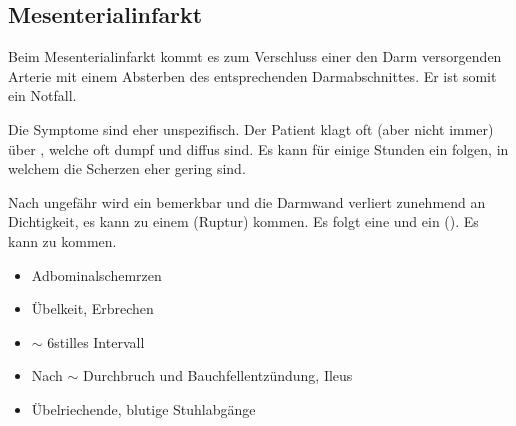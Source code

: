 \bigskip



\subsection{Mesenterialinfarkt}
\label{topic:mesenterialinfarkt}

Beim Mesenterialinfarkt kommt es zum Verschluss einer den
Darm versorgenden Arterie
 mit einem Absterben des entsprechenden
Darmabschnittes. Er ist somit ein  Notfall.

{Die Symptome sind eher unspezifisch. Der Patient klagt oft
(aber nicht immer) über , welche
oft dumpf und diffus sind. Es kann für einige Stunden ein
 folgen, in welchem die Scherzen eher
gering sind. 

Nach ungefähr \Hour* wird ein
 bemerkbar und die Darmwand verliert
zunehmend an Dichtigkeit, es kann zu einem 
(Ruptur) kommen. Es folgt eine  und
ein  (). Es kann zu
 kommen.
\cite{SiewertChirurgie8-06-Gefaesschirurgie}
% 

}
{\begin{itemize}
  \item Adbominalschemrzen
  \item Übelkeit, Erbrechen
  \item $\sim$ 6\Hour* stilles Intervall
  \item Nach $\sim$ \Hour* Durchbruch und
  Bauchfellentzündung, Ileus
  \item Übelriechende, blutige Stuhlabgänge
\end{itemize}}
{}
{}
{}

